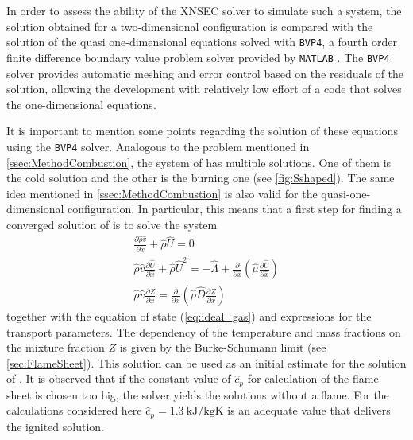 In order to assess the ability of the XNSEC solver to simulate such a system, the solution obtained for a two-dimensional configuration is compared with the solution of the quasi one-dimensional equations solved with \lstinline|BVP4|, a fourth order finite difference boundary value problem solver provided by \lstinline|MATLAB| \parencite{kierzenkaBVPSolverBased2001}. The \lstinline|BVP4| solver provides automatic meshing and error control based on the residuals of the solution, allowing the development with relatively low effort of a code that solves the one-dimensional equations.

It is important to mention some points regarding the solution of these equations using the \lstinline|BVP4| solver. Analogous to the problem mentioned in \cref{ssec:MethodCombustion}, the system of   has multiple solutions. One of them is the cold solution and the other is the burning one (see \cref{fig:Sshaped}). The same idea mentioned in \cref{ssec:MethodCombustion} is also valid for the quasi-one-dimensional configuration. In particular, this means that a first step for finding a converged solution of  is to solve the system
\begin{subequations}
\begin{gather}
\frac{\partial \hat \rho \hat v}{\partial \hat x} +  \hat \rho \hat U = 0\\ \label{eq:OneDimCont2}%
\hat \rho \hat v \frac{\partial \hat U}{\partial \hat x} + \hat \rho \hat U^2 =
- \hat \Lambda
+ \frac{\partial}{\partial \hat x}\left(\hat \mu \frac{\partial \hat U}{\partial \hat x}\right)\\ \label{eq:OneDimMom2}%
\hat \rho \hat v \frac{\partial Z}{\partial \hat x} = 
\frac{\partial}{\partial \hat x}\left(\hat \rho \hat D \frac{\partial Z}{\partial \hat x}\right)
\end{gather}\label{eqs:OneDimEquationsMixtureFraction}
\end{subequations}
together with the equation of state (\ref{eq:ideal_gas}) and expressions for the transport parameters. The dependency of the temperature and mass fractions on the mixture fraction $Z$ is given by the Burke-Schumann limit (see \cref{sec:FlameSheet}). This solution can be used as an initial estimate for the solution of . It is observed that if the constant value of $\hat c_p$ for calculation of the flame sheet is chosen too big, the solver yields the solutions without a flame. For the calculations considered here $\hat c_p =\SI{1.3}{\kilo \joule\per\kilogram \kelvin}$ is an adequate value that delivers the ignited solution.

